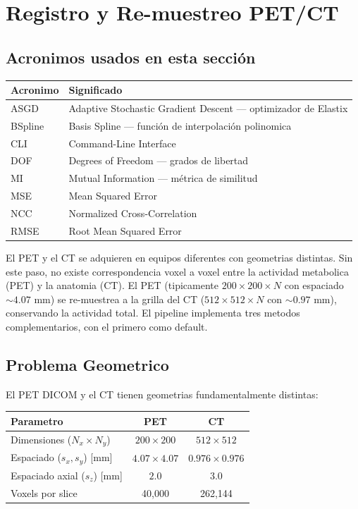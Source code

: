 \documentclass[12pt,a4paper]{article}
\begin{document}
\section{Registro y Re-muestreo PET/CT}
\label{sec:registro}

\subsection*{Acronimos usados en esta sección}
\begin{tabular}{ll}
\toprule
\textbf{Acronimo} & \textbf{Significado} \\
\midrule
ASGD & Adaptive Stochastic Gradient Descent --- optimizador de Elastix \\
BSpline & Basis Spline --- función de interpolación polinomica \\
CLI & Command-Line Interface \\
DOF & Degrees of Freedom --- grados de libertad \\
MI & Mutual Information --- métrica de similitud \\
MSE & Mean Squared Error \\
NCC & Normalized Cross-Correlation \\
RMSE & Root Mean Squared Error \\
\bottomrule
\end{tabular}

El PET y el CT se adquieren en equipos diferentes con geometrias distintas. Sin este paso, no
existe correspondencia voxel a voxel entre la actividad metabolica (PET) y la anatomia (CT).
El PET (tipicamente $200\times200\times N$ con espaciado $\sim 4.07$ mm) se re-muestrea a la
grilla del CT ($512\times512\times N$ con $\sim 0.97$ mm), conservando la actividad total.
El pipeline implementa tres metodos complementarios, con el primero como default.

\subsection{Problema Geometrico}

El PET DICOM y el CT tienen geometrias fundamentalmente distintas:

\begin{table}[H]
\centering
\begin{tabular}{l c c}
\toprule
\textbf{Parametro} & \textbf{PET} & \textbf{CT} \\
\midrule
Dimensiones ($N_x \times N_y$) & $200 \times 200$ & $512 \times 512$ \\
Espaciado ($s_x, s_y$) [mm] & $4.07 \times 4.07$ & $0.976 \times 0.976$ \\
Espaciado axial ($s_z$) [mm] & $2.0$ & $3.0$ \\
Voxels por slice & 40,000 & 262,144 \\
\bottomrule
\end{tabular}
\end{table}
\end{document}
